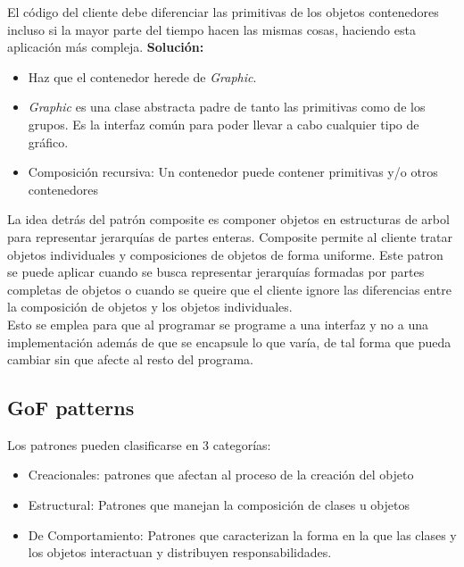 \documentclass[11pt]{article}
\theoremstyle{plain}
\begin{document}
            El código del cliente debe diferenciar las primitivas de los objetos contenedores incluso si la mayor parte del tiempo hacen las mismas cosas, haciendo esta aplicación más compleja. \textbf{Solución:}
            \begin{itemize}
                \item Haz que el contenedor herede de \textit{Graphic}.
                \item \textit{Graphic} es una clase abstracta padre de tanto las primitivas como de los grupos. Es la interfaz común para poder llevar a cabo cualquier tipo de gráfico.
                \item Composición recursiva: Un contenedor puede contener primitivas y/o otros contenedores 
            \end{itemize}

            La idea detrás del patrón composite es componer objetos en estructuras de arbol para representar jerarquías de partes enteras. Composite permite al cliente tratar objetos individuales y composiciones de objetos de forma uniforme. Este patron se puede aplicar cuando se busca representar jerarquías formadas por partes completas de objetos o cuando se queire que el cliente ignore las diferencias entre la composición de objetos y los objetos individuales.\\

            Esto se emplea para que al programar se programe a una interfaz y no a una implementación además de que se encapsule lo que varía, de tal forma que pueda cambiar sin que afecte al resto del programa.
        \subsection{GoF patterns} %
        \label{sub:gof_patterns}
            Los patrones pueden clasificarse en 3 categorías:
            \begin{itemize}
                \item Creacionales: patrones que afectan al proceso de la creación del objeto
                \item Estructural: Patrones que manejan la composición de clases u objetos
                \item De Comportamiento: Patrones que caracterizan la forma en la que las clases y los objetos interactuan y distribuyen responsabilidades.
            \end{itemize}
\end{document}
